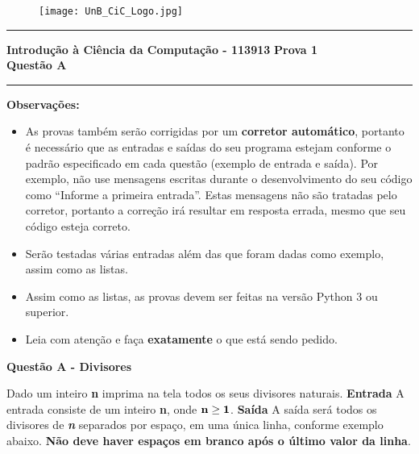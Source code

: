 \documentclass[a4paper, 12pt]{article}
\begin{document}
\begin{figure}[H]
	\texttt{[image: UnB\_CiC\_Logo.jpg]}
\end{figure}
\noindent\rule{\textwidth}{0.4pt}
\begin{center}
	\textbf{{\Large Introdução à Ciência da Computação - 113913}} \newline \newline
	\textbf{{\large Prova 1} \\
	\vspace{9pt}
	{\large Questão A}} \\
	\noindent\rule{\textwidth}{0.4pt}
	\newline
\end{center}

\textbf{{\large Observações:}}
\begin{itemize}
	\item As provas também serão corrigidas por um \textbf{corretor automático}, portanto é necessário que as entradas e saídas do seu programa estejam conforme o padrão especificado em cada questão (exemplo de entrada e saída). Por exemplo, não use mensagens escritas durante o desenvolvimento do seu código como “Informe a primeira entrada”. Estas mensagens não são tratadas pelo corretor, portanto a correção irá resultar em resposta errada, mesmo que seu código esteja correto.
	\item Serão testadas várias entradas além das que foram dadas como exemplo, assim como as listas.
	\item Assim como as listas, as provas devem ser feitas na versão Python 3 ou superior.
	\item Leia com atenção e faça \textbf{exatamente} o que está sendo pedido.
\end{itemize}
\newpage %
\begin{center}
\textbf{{\Large Questão A - Divisores}}
\end{center}
\vspace{5pt}
Dado um inteiro \textbf{n} imprima na tela todos os seus divisores naturais.
\newline \newline
\textbf{{\large Entrada}} \newline
A entrada consiste de um inteiro \textbf{n}, onde $\textrm{\textbf{n}} \geq \textrm{\textbf{1}}$.
\newline \newline
\textbf{{\large Saída}} \newline
A saída será todos os divisores de \textbf{\textit{n}} separados por espaço, em uma única linha, conforme exemplo abaixo. \textbf{Não deve haver espaços em branco após o último valor da linha}.
\end{document}
